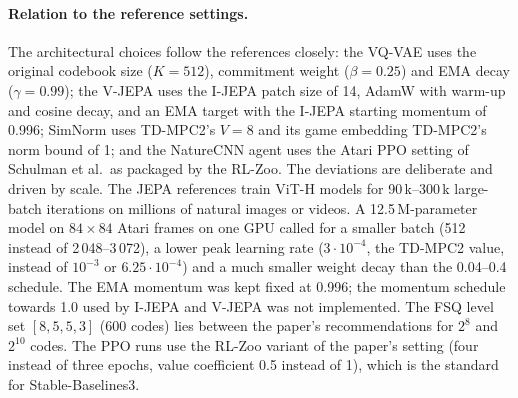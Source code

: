 \documentclass[runningheads]{llncs}
\begin{document}
\paragraph{Relation to the reference settings.}
The architectural choices follow the references closely: the VQ-VAE uses the original
codebook size ($K=512$), commitment weight ($\beta=0.25$) and EMA decay ($\gamma=0.99$);
the V-JEPA uses the I-JEPA patch size of 14, AdamW with warm-up and cosine decay, and an
EMA target with the I-JEPA starting momentum of 0.996; SimNorm uses TD-MPC2's $V=8$ and
its game embedding TD-MPC2's norm bound of 1; and the NatureCNN agent uses the Atari PPO
setting of Schulman et al.\ as packaged by the RL-Zoo. The deviations are deliberate and
driven by scale. The JEPA references train ViT-H models for 90\,k--300\,k large-batch
iterations on millions of natural images or videos. A 12.5\,M-parameter model on
$84\times84$ Atari frames on one GPU called for a smaller batch (512 instead of
2\,048--3\,072), a lower peak learning rate ($3\cdot10^{-4}$, the TD-MPC2 value, instead
of $10^{-3}$ or $6.25\cdot10^{-4}$) and a much smaller weight decay than the 0.04--0.4
schedule. The EMA momentum was kept fixed at 0.996; the momentum schedule towards 1.0
used by I-JEPA and V-JEPA was not implemented. The FSQ level set $[8,5,5,3]$ (600 codes)
lies between the paper's recommendations for $2^8$ and $2^{10}$ codes. The PPO runs use
the RL-Zoo variant of the paper's setting (four instead of three epochs, value coefficient
0.5 instead of 1), which is the standard for Stable-Baselines3.
\end{document}
